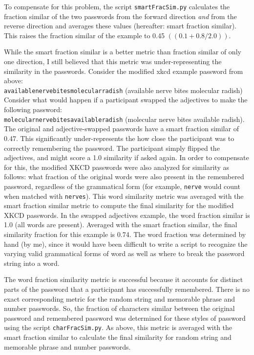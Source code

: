 \documentclass{article}
\begin{document}
To compensate for this problem, the script \texttt{smartFracSim.py} calculates the fraction similar of the two passwords from the forward direction \emph{and} from the reverse direction and averages these values (hereafter: smart fraction similar). This raises the fraction similar of the example to 0.45 $((0.1 + 0.8 / 2.0))$.

While the smart fraction similar is a better metric than fraction similar of only one direction, I still believed that this metric was under-representing the similarity in the passwords. Consider the modified xkcd example password from above: \\

\noindent \texttt{availablenervebitesmolecularradish} (available nerve bites molecular radish) \\

Consider what would happen if a participant swapped the adjectives to make the following password:\\

\noindent \texttt{molecularnervebitesavailableradish} (molecular nerve bites available radish). \\

The original and adjective-swapped passwords have a smart fraction similar of 0.47. This significantly under-represents the how close the participant was to correctly remembering the password. The participant simply flipped the adjectives, and might score a 1.0 similarity if asked again. In order to compensate for this, the modified XKCD passwords were also analyzed for similarity as follows: what fraction of the original words were also present in the remembered password, regardless of the grammatical form (for example, \texttt{nerve} would count when matched with \texttt{nerves}). This word similarity metric was averaged with the smart fraction similar metric to compute the final similarity for the modified XKCD passwords. In the swapped adjectives example, the word fraction similar is 1.0 (all words are present). Averaged with the smart fraction similar, the final similarity fraction for this example is 0.74. The word fraction was determined by hand (by me), since it would have been difficult to write a script to recognize the varying valid grammatical forms of word as well as where to break the password string into a word.

The word fraction similarity metric is successful because it accounts for distinct parts of the password that a participant has successfully remembered. There is no exact corresponding metric for the random string and memorable phrase and number passwords. So, the fraction of characters similar between the original password and remembered password was determined for these styles of password using the script \texttt{charFracSim.py}. As above, this metric is averaged with the smart fraction similar to calculate the final similarity for random string and memorable phrase and number passwords.
\end{document}
